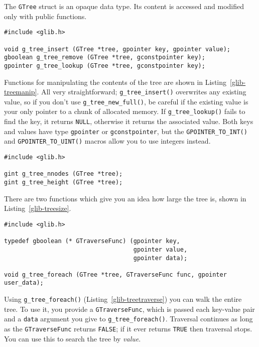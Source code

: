 The \lstinline{GTree} struct is an opaque data type. Its content is accessed and modified only with public functions.

\begin{lstlisting}[float, caption={Manipulating \lstinline{GTree} contents}, label=glib-treemanip]
#include <glib.h>

void g_tree_insert (GTree *tree, gpointer key, gpointer value);
gboolean g_tree_remove (GTree *tree, gconstpointer key);
gpointer g_tree_lookup (GTree *tree, gconstpointer key);
\end{lstlisting}

Functions for manipulating the contents of the tree are shown in Listing~\ref{glib-treemanip}. All very straightforward; \lstinline{g_tree_insert()} overwrites any existing value, so if you don't use \lstinline{g_tree_new_full()}, be careful if the existing value is your only pointer to a chunk of allocated memory. If \lstinline{g_tree_lookup()} fails to find the key, it returns \lstinline{NULL}, otherwise it returns the associated value. Both keys and values have type \lstinline{gpointer} or \lstinline{gconstpointer}, but the \lstinline{GPOINTER_TO_INT()} and \lstinline{GPOINTER_TO_UINT()} macros allow you to use integers instead.

\begin{lstlisting}[float, caption={Determining the size of a \lstinline{GTree}}, label=glib-treesize]
#include <glib.h>

gint g_tree_nnodes (GTree *tree);
gint g_tree_height (GTree *tree);
\end{lstlisting}

There are two functions which give you an idea how large the tree is, shown in Listing~\ref{glib-treesize}.

\begin{lstlisting}[float, caption={Traversing a \lstinline{GTree}}, label=glib-treetraverse]
#include <glib.h>

typedef gboolean (* GTraverseFunc) (gpointer key,
                                    gpointer value,
                                    gpointer data);

void g_tree_foreach (GTree *tree, GTraverseFunc func, gpointer user_data);
\end{lstlisting}

Using \lstinline{g_tree_foreach()} (Listing~\ref{glib-treetraverse}) you can walk the entire tree. To use it, you provide a \lstinline{GTraverseFunc}, which is passed each key-value pair and a \lstinline{data} argument you give to \lstinline{g_tree_foreach()}. Traversal continues as long as the \lstinline{GTraverseFunc} returns \lstinline{FALSE}; if it ever returns \lstinline{TRUE} then traversal stops. You can use this to search the tree by \emph{value}.

